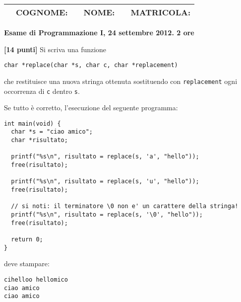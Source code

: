 \documentclass{article}[10pt]
\newcounter{esnu}
\newenvironment{esercizio}{\medskip \noindent {\bf Esercizio\addtocounter{esnu}{1} \arabic{esnu}}}{}
\begin{document}
\begin{tabular}{llclcr}
 \hspace{-35pt} &{\bf COGNOME:} & \hspace{100pt}        &{\bf NOME:}    & \hspace{100pt}        &{\bf MATRICOLA:}\hspace{35pt} \\
\hline
\end{tabular}
\begin{center} {\bf Esame di Programmazione I, 24 settembre 2012. 2 ore}\end{center}

\begin{esercizio}
\textbf{[14 punti]}
Si scriva una funzione

\begin{verbatim}
char *replace(char *s, char c, char *replacement)
\end{verbatim}

\noindent
che restituisce una nuova stringa ottenuta sostituendo con \texttt{replacement}
ogni occorrenza di \texttt{c} dentro \texttt{s}.

Se tutto \`e corretto, l'esecuzione del seguente programma:

{\small
\begin{verbatim}
int main(void) {
  char *s = "ciao amico";
  char *risultato;

  printf("%s\n", risultato = replace(s, 'a', "hello"));
  free(risultato);

  printf("%s\n", risultato = replace(s, 'u', "hello"));
  free(risultato);

  // si noti: il terminatore \0 non e' un carattere della stringa!
  printf("%s\n", risultato = replace(s, '\0', "hello"));
  free(risultato);

  return 0;
}
\end{verbatim}
}

\noindent
deve stampare:

{\small
\begin{verbatim}
cihelloo hellomico
ciao amico
ciao amico
\end{verbatim}
}

\end{esercizio}
\end{document}
